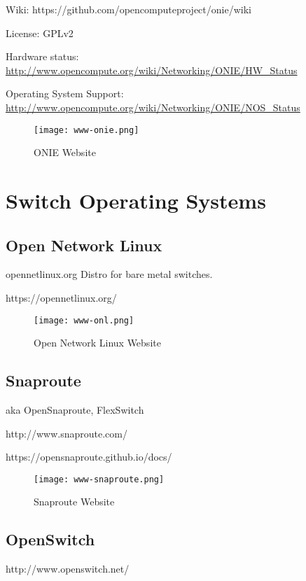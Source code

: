 Wiki: https://github.com/opencomputeproject/onie/wiki

License: GPLv2

Hardware status: \url{http://www.opencompute.org/wiki/Networking/ONIE/HW_Status}

Operating System Support: \url{http://www.opencompute.org/wiki/Networking/ONIE/NOS_Status}

\begin{figure}[h!]
\texttt{[image: www-onie.png]}
 \caption{ONIE Website}
 \label{fig:www-onie}
\end{figure}


\section{Switch Operating Systems}

\subsection{Open Network Linux}
opennetlinux.org
Distro for bare metal switches.

https://opennetlinux.org/

\begin{figure}[h!]
\texttt{[image: www-onl.png]}
 \caption{Open Network Linux Website}
 \label{fig:www-onl}
\end{figure}


\subsection{Snaproute}
aka OpenSnaproute, FlexSwitch

http://www.snaproute.com/

https://opensnaproute.github.io/docs/

\begin{figure}[h!]
\texttt{[image: www-snaproute.png]}
 \caption{Snaproute Website}
 \label{fig:www-snaproute}
\end{figure}


\subsection{OpenSwitch}

http://www.openswitch.net/

